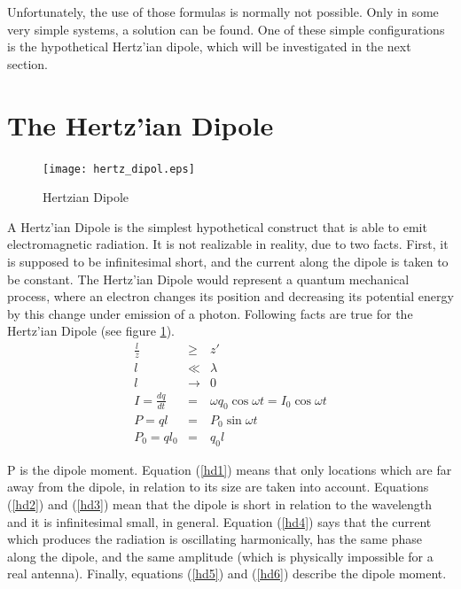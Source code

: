 \documentclass[a4paper,14pt]{extbook}
\begin{document}
Unfortunately, the use of those formulas is normally not possible. Only in some very simple systems, a solution can be found. One of these simple configurations is the hypothetical Hertz'ian dipole, which will be investigated in the next section.

\section{The Hertz'ian Dipole}

\begin{figure}
\begin{center}  %
  \texttt{[image: hertz\_dipol.eps]}\\
\caption{Hertzian Dipole}\label{fig_hertz_dipol}
\end{center}
\end{figure}

A Hertz'ian Dipole is the simplest hypothetical construct that is able to emit electromagnetic radiation. It is not realizable in reality, due to two facts. First, it is supposed to be infinitesimal short, and the current along the dipole is taken to be constant. The Hertz'ian Dipole would represent a quantum mechanical process, where an electron changes its position and decreasing its potential energy by this change under emission of a photon. Following facts are true for the Hertz'ian Dipole (see figure \ref{fig_hertz_dipol}).\\

\begin{eqnarray}
\frac{l}{z} &\geq& z' \label{hd1} \\
l &\ll& \lambda \label{hd2} \\
l &\rightarrow& 0 \label{hd3} \\
I=\frac{dq}{dt} &=& \omega q_0 \cos{\omega t} = I_0 \cos{\omega t} \label{hd4} \\
P=ql &=& P_0 \sin{\omega t}  \label{hd5} \\
P_0=ql_0 &=& q_0 l \label{hd6}
\end{eqnarray}

P is the dipole moment. Equation (\ref{hd1}) means that only locations which are far away from the dipole, in relation to its size are taken into account. Equations (\ref{hd2}) and (\ref{hd3}) mean that the dipole is short in relation to the wavelength and it is infinitesimal small, in general. Equation (\ref{hd4}) says that the current which produces the radiation is oscillating harmonically, has the same phase along the dipole, and the same amplitude (which is physically impossible for a real antenna). Finally, equations (\ref{hd5}) and (\ref{hd6}) describe the dipole moment.\\
\end{document}

